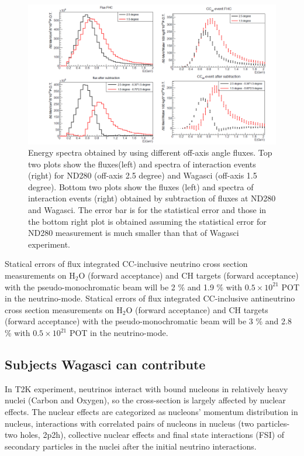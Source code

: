 \begin{figure}[tbh]
\begin{center}
\includegraphics[width=\textwidth]{fig/fluxsubtractFHC.pdf}
\end{center}
\caption{Energy spectra obtained by using different off-axis angle fluxes.
  Top two plots show the fluxes(left) and spectra of interaction events (right) for ND280 (off-axis 2.5 degree) and Wagasci (off-axis 1.5 degree). Bottom two plots show the fluxes (left) and spectra of interaction events (right) obtained by
  subtraction of fluxes at ND280 and Wagasci.
  The error bar is for the statistical error and those in the bottom right plot is obtained assuming the statistical error
  for ND280 measurement is much smaller than that of Wagasci experiment.
}
\label{fig:fluxsubtfhc}
\end{figure}


Statical errors of flux integrated CC-inclusive neutrino cross section measurements on H$_{2}$O (forward acceptance) and CH targets (forward acceptance) with the pseudo-monochromatic beam
will be 2 \% and 1.9 \% with $0.5\times 10^{21}$ POT in the neutrino-mode.
Statical errors of flux integrated CC-inclusive antineutrino cross section measurements on H$_{2}$O (forward acceptance) and CH targets (forward acceptance) with the pseudo-monochromatic beam
will be 3 \% and 2.8 \% with $0.5\times 10^{21}$ POT in the neutrino-mode.


\subsection{Subjects Wagasci can contribute}
In T2K experiment, neutrinos interact with bound nucleons in relatively heavy nuclei (Carbon and Oxygen), so the cross-section is largely affected by nuclear effects.
The nuclear effects are categorized as nucleons' momentum distribution in nucleus, interactions with  correlated pairs of nucleons in nucleus (two particles-two holes, 2p2h), collective nuclear effects 
and final state interactions (FSI) of secondary particles in the nuclei after the initial neutrino interactions.



